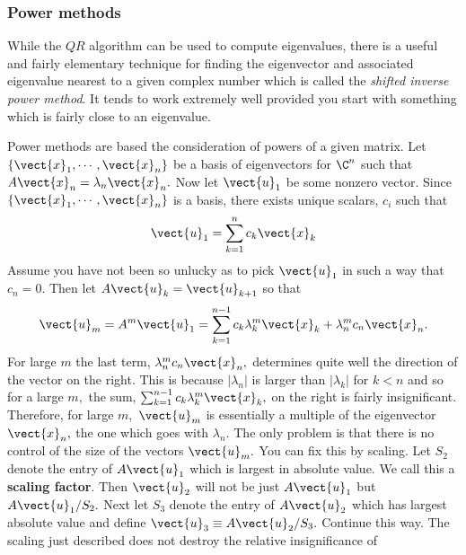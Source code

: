 \subsubsection{Power methods}

While the $QR$ algorithm can be used to compute eigenvalues, there is a useful and fairly elementary technique for
finding the eigenvector and associated eigenvalue nearest to a given complex number which
is called the {\em shifted inverse power method}. It tends to work extremely well provided you
start with something which is fairly close to an eigenvalue.

Power methods are based the consideration of powers of a given matrix. Let $
\left\{ 
\vect{x}_{1},\cdots ,\vect{x}_{n}\right\} $ be a basis of eigenvectors for $
\C^{n}$ such that $A\vect{x}_{n}=\lambda _{n}\vect{x}_{n}.$ Now let $
\vect{u}_{1}$ be some nonzero vector. Since $\left\{ \vect{x}_{1},\cdots ,\vect{x}_{n}\right\} $ is a basis, there exists unique scalars, $c_{i}$ such that 
\begin{equation*}
\vect{u}_{1}=\sum_{k=1}^{n}c_{k}\vect{x}_{k}
\end{equation*}
Assume you have not been so unlucky as to pick $\vect{u}_{1}$ in such a way
that $c_{n}=0.$ Then let $A\vect{u}_{k}=\vect{u}_{k+1}$ so that 
\begin{equation}
\vect{u}_{m}=A^{m}\vect{u}_{1}=\sum_{k=1}^{n-1}c_{k}\lambda _{k}^{m}\vect{x}
_{k}+\lambda _{n}^{m}c_{n}\vect{x}_{n}.  \label{20maye1}
\end{equation}
For large $m$ the last term, $\lambda _{n}^{m}c_{n}\vect{x}_{n},$ determines
quite well the direction of the vector on the right. This is because $
\left\vert \lambda _{n}\right\vert $ is larger than $\left\vert \lambda
_{k}\right\vert $ for $k<n$ and so for a large $m,$ the sum, $\sum_{k=1}^{n-1}c_{k}\lambda _{k}^{m}\vect{x}_{k},$ on the right is fairly
insignificant. Therefore, for large $m,$ $\vect{u}_{m}$ is essentially a
multiple of the eigenvector $\vect{x}_{n},$ the one which goes with $\lambda
_{n}.$ The only problem is that there is no control of the size of the
vectors $\vect{u}_{m}.$ You can fix this by scaling. Let $S_{2}$ denote the
entry of $A\vect{u}_{1}$ which is largest in absolute value. We call this a 
 \textbf{scaling factor}. Then $\vect{u}_{2}$ will not be just $A\vect{u}_{1}$ but $A\vect{u}_{1}/S_{2}.$ Next
let $S_{3}$ denote the entry of $A\vect{u}_{2}$ which has largest absolute
value and define $\vect{u}_{3}\equiv A\vect{u}_{2}/S_{3}.$ Continue this way.
The scaling just described does not destroy the relative insignificance of
